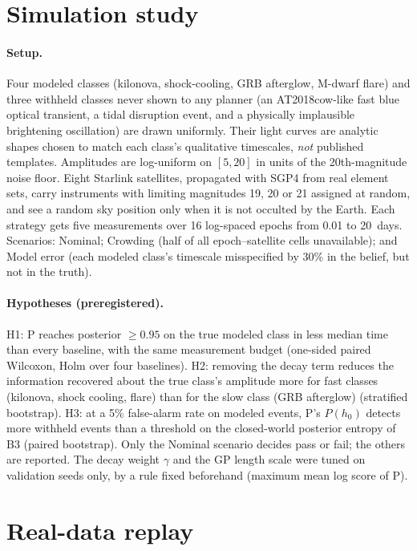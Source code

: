 \section{Simulation study}\label{sec:sim}
\paragraph{Setup.} Four modeled classes (kilonova, shock-cooling, GRB afterglow, M-dwarf flare) and three withheld classes never shown to any planner (an AT2018cow-like fast blue optical transient, a tidal disruption event, and a physically implausible brightening oscillation) are drawn uniformly. Their light curves are analytic shapes chosen to match each class's qualitative timescales, \emph{not} published templates. Amplitudes are log-uniform on $[5,20]$ in units of the 20th-magnitude noise floor. Eight Starlink satellites, propagated with SGP4 from real element sets, carry instruments with limiting magnitudes 19, 20 or 21 assigned at random, and see a random sky position only when it is not occulted by the Earth. Each strategy gets five measurements over 16 log-spaced epochs from 0.01 to 20~days. Scenarios: Nominal; Crowding (half of all epoch--satellite cells unavailable); and Model error (each modeled class's timescale misspecified by 30\% in the belief, but not in the truth).

\paragraph{Hypotheses (preregistered).} H1: P reaches posterior $\geq 0.95$ on the true modeled class in less median time than every baseline, with the same measurement budget (one-sided paired Wilcoxon, Holm over four baselines). H2: removing the decay term reduces the information recovered about the true class's amplitude more for fast classes (kilonova, shock cooling, flare) than for the slow class (GRB afterglow) (stratified bootstrap). H3: at a 5\% false-alarm rate on modeled events, P's $P(h_0)$ detects more withheld events than a threshold on the closed-world posterior entropy of B3 (paired bootstrap). Only the Nominal scenario decides pass or fail; the others are reported. The decay weight $\gamma$ and the GP length scale were tuned on validation seeds only, by a rule fixed beforehand (maximum mean log score of P).



\section{Real-data replay}\label{sec:real}

